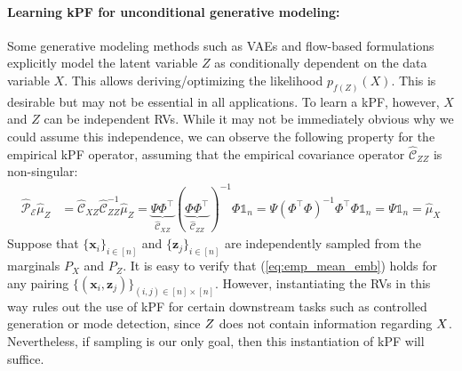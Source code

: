 \paragraph{Learning kPF for unconditional generative modeling:} Some generative modeling methods such as VAEs and 
flow-based formulations explicitly model the latent variable $Z$ as conditionally dependent on the data variable $X$. This allows deriving/optimizing the likelihood $p_{f(Z)}(X)$. 
This is desirable but may not be essential in all 
applications. 
To learn a kPF, however, $X$ and $Z$ can be independent RVs. While it may not be immediately obvious why we could assume this independence, we can observe the following property for the empirical kPF operator, assuming that the empirical covariance operator $\hat{\mathcal{C}}_{ZZ}$ is non-singular:
%
%
\begin{align}\label{eq:emp_mean_emb}
    \hat{\mathcal{P}}_{\mathcal{E}}\hat{\mu}_{Z} &= \hat{\mathcal{C}}_{XZ}\hat{\mathcal{C}}_{ZZ}^{-1}\hat{\mu}_{Z} = \underbrace{\Psi \Phi^\top}_{\hat{\mathcal{C}}_{XZ}} (\underbrace{\Phi \Phi^\top}_{\hat{\mathcal{C}}_{ZZ}})^{-1} \Phi \mathds{1}_{n}
    = {\Psi (\Phi^\top \Phi)^{-1} \Phi^\top \Phi} \mathds{1}_{n} = \Psi \mathds{1}_{n} = \hat{\mu}_{X}
\end{align}
%
Suppose that $\{\mathbf{x}_i\}_{i \in [n]}$ and $\{\mathbf{z}_j\}_{i \in [n]}$ are independently sampled from the marginals $P_X$ and $P_Z$. It is easy to verify that (\ref{eq:emp_mean_emb}) holds for any pairing $\{(\mathbf{x}_i, \mathbf{z}_j)\}_{(i, j) \in [n] \times [n]}$. However, instantiating the RVs in this way rules out the use of kPF for certain downstream tasks such as controlled generation or mode detection, since $\var{Z}$ does not contain information regarding $\var{X}$. Nevertheless, if sampling is our only goal, then this instantiation of kPF will suffice.

